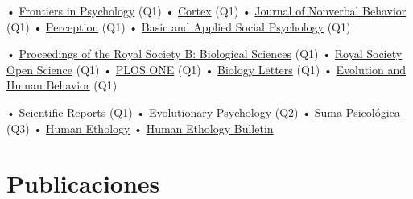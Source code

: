 \documentclass[11pt,a4paper,]{awesome-cv}
\begin{document}
\begin{footnotesize}
  \begin{minipage}[c]{0.32\linewidth}
    • \href{https://www.frontiersin.org/journals/psychology}{Frontiers in Psychology} (Q1)\newline
    • \href{https://www.sciencedirect.com/journal/cortex}{Cortex} (Q1)\newline
    • \href{https://www.springer.com/journal/10919/}{Journal of Nonverbal Behavior} (Q1)\newline
    • \href{https://journals.sagepub.com/home/pec}{Perception} (Q1)\newline
    • \href{https://www.tandfonline.com/journals/hbas20}{Basic and Applied Social Psychology} (Q1)\newline
  \end{minipage}\begin{minipage}[c]{0.45\linewidth}
    • \href{https://royalsocietypublishing.org/journal/rspb}{Proceedings of the Royal Society B: Biological Sciences} (Q1)\newline
    • \href{https://royalsocietypublishing.org/journal/rsos}{Royal Society Open Science} (Q1)\newline
    • \href{https://journals.plos.org/plosone/}{PLOS ONE} (Q1)\newline
    • \href{https://royalsocietypublishing.org/journal/rsbl}{Biology Letters} (Q1)\newline
    • \href{https://www.sciencedirect.com/journal/evolution-and-human-behavior}{Evolution and Human Behavior} (Q1)\newline
  \end{minipage}\begin{minipage}[c]{0.23\linewidth}
    • \href{https://www.nature.com/srep/}{Scientific Reports} (Q1)\newline
    • \href{https://journals.sagepub.com/home/evp}{Evolutionary Psychology} (Q2)\newline
    • \href{http://sumapsicologica.konradlorenz.edu.co/}{Suma Psicológica} (Q3)\newline
    • \href{https://ishe.org/human-ethology/}{Human Ethology}\newline
    • \href{https://ishe.org/human-ethology-bulletin-2006-2011/}{Human Ethology Bulletin}
  \end{minipage}
\end{footnotesize}

\hypertarget{publicaciones}{%
\section{Publicaciones}\label{publicaciones}}
\end{document}
